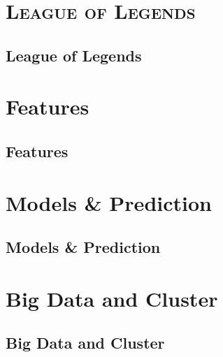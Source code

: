 \documentclass[xcolor=x11names,compress]{beamer}
\renewcommand{\(}{\begin{columns}}
\renewcommand{\)}{\end{columns}}
\newcommand{\<}[1]{\begin{column}{#1}}
\renewcommand{\>}{\end{column}}
\begin{document}
	
	\section{\scshape League of Legends}
	\subsection{League of Legends}
	
	\section{Features}
	\subsection{Features}
		
	\section{Models \& Prediction}
	\subsection{Models \& Prediction}
	
	\section{Big Data and Cluster}
	\subsection{Big Data and Cluster}
	
	
\end{document}
